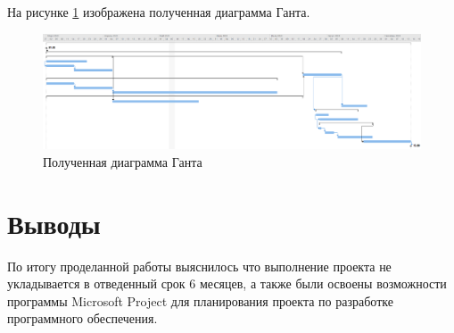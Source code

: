 На рисунке \ref{p9} изображена полученная диаграмма Ганта.
\begin{figure}[!h]
	\centering
	\includegraphics[width=1\linewidth]{inc/img/9.png}
	\caption{Полученная диаграмма Ганта}
	\label{p9}
\end{figure}

\section*{Выводы}
По итогу проделанной работы выяснилось что выполнение проекта не укладывается в отведенный срок 6 месяцев, а также были освоены возможности программы Microsoft Project для планирования проекта по разработке программного обеспечения.